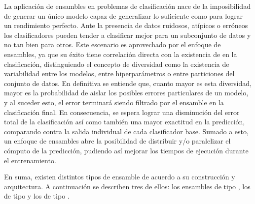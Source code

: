 La aplicación de ensambles en problemas de clasificación nace de la
imposibilidad de generar un único modelo capaz de generalizar lo suficiente como
para lograr un rendimiento perfecto. Ante la presencia de datos ruidosos,
atípicos o erróneos los clasificadores pueden tender a clasificar mejor para un
subconjunto de datos y no tan bien para otros. Este escenario es aprovechado por
el enfoque de ensambles, ya que su éxito tiene correlación directa con la
existencia de  en la clasificación, distinguiendo el
concepto de diversidad como la existencia de variabilidad entre los modelos,
entre hiperparámetros o entre particiones del conjunto de datos. En definitiva
se entiende que, cuanto mayor es esta diversidad, mayor es la probabilidad de
aislar los posibles errores particulares de un modelo, y al suceder esto, el
error terminará siendo filtrado por el ensamble en la clasificación final. En
consecuencia, se espera lograr una disminución del error total de la
clasificación así como también una mayor exactitud en la predicción, comparando
contra la salida individual de cada clasificador base. Sumado a esto, un
enfoque de ensambles abre la posibilidad de distribuir y/o paralelizar el
cómputo de la predicción, pudiendo así mejorar los tiempos de ejecución durante
el entrenamiento.

En suma, existen distintos tipos de ensamble de acuerdo a su construcción y
arquitectura. A continuación se describen tres de ellos: los ensambles de tipo
, los de tipo  y los de
tipo .


